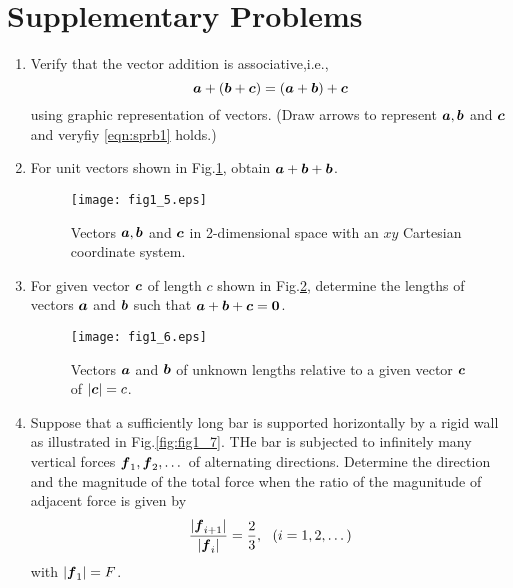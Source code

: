 \documentclass[10pt,a4j]{article}
\begin{document}
\section{Supplementary Problems}
\begin{enumerate}
\item
	Verify that the vector addition is associative,i.e., 
	\begin{equation}
		\mbox{\boldmath $a$}+(\mbox{\boldmath $b$}+\mbox{\boldmath $c$})= (\mbox{\boldmath $a$}+\mbox{\boldmath $b$})+\mbox{\boldmath $c$}
	\label{eqn:sprb1}
	\end{equation}
	using graphic representation of vectors. 
	(Draw arrows to represent $\mbox{\boldmath $a$},\mbox{\boldmath $b$}$ and $\mbox{\boldmath $c$}$ and veryfiy \ref{eqn:sprb1} holds.)
\item
	For unit vectors shown in Fig.\ref{fig:fig1_5}, obtain $\mbox{\boldmath $a$}+\mbox{\boldmath $b$}+\mbox{\boldmath $b$}$.  
	\begin{figure}[h]
	\begin{center}
	\texttt{[image: fig1\_5.eps]} 
	\end{center}
	\caption{Vectors $\mbox{\boldmath $a$}, \mbox{\boldmath $b$}$ and $\mbox{\boldmath $c$}$ in 2-dimensional space with an
	$xy$ Cartesian coordinate system.}
	\label{fig:fig1_5}
	\end{figure}
\item
	For given vector $\mbox{\boldmath $c$}$ of length $c$ shown in Fig.\ref{fig:fig1_6}, determine the lengths of vectors 
	$\mbox{\boldmath $a$}$ and $\mbox{\boldmath $b$}$ such that $\mbox{\boldmath $a$}+\mbox{\boldmath $b$}+\mbox{\boldmath $c$}=\mbox{\boldmath $0$}$.
	\begin{figure}[h]
	\begin{center}
	\texttt{[image: fig1\_6.eps]} 
	\end{center}
		\caption{
			Vectors $\mbox{\boldmath $a$}$ and $\mbox{\boldmath $b$}$ of unknown lengths relative to 
			a given vector $\mbox{\boldmath $c$}$ of $|\mbox{\boldmath $c$}|=c$.} 
	\label{fig:fig1_6}
	\end{figure}
\item
	Suppose that a sufficiently long bar is supported horizontally by a rigid wall as 
	illustrated in Fig.\ref{fig:fig1_7}. THe bar is subjected to 
	infinitely many vertical forces $\mbox{\boldmath $f$}_1,\mbox{\boldmath $f$}_2,\dots $ of alternating 
	directions. Determine the direction and the magnitude of the total force 
	when the ratio of the magunitude of adjacent force is given by
	\begin{equation}
		\frac{| \mbox{\boldmath $f$}_{i+1}|}{|\mbox{\boldmath $f$}_i|}=\frac{2}{3}, \ \ (i=1,2,\dots)
		\label{eqn:}
	\end{equation}
	with $|\mbox{\boldmath $f$}_1|=F$.
	\begin{figure}[h]
	\begin{center}

\end{center}
\end{figure}
\end{enumerate}
\end{document}
